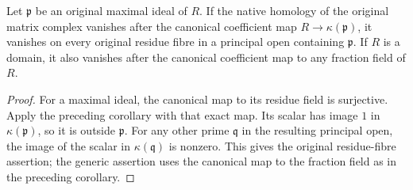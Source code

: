 \begin{corollary}
\label{cor:kn-specialization-original-closed-native-homology}
\leanok
{}
Let $\mathfrak p$ be an original maximal ideal of $R$.  If the
native homology of the original matrix complex vanishes after the
canonical coefficient map $R\to\kappa(\mathfrak p)$, it vanishes
on every original residue fibre in a principal open containing
$\mathfrak p$.  If $R$ is a domain, it also vanishes after the
canonical coefficient map to any fraction field of $R$.
\end{corollary}
\begin{proof}
For a maximal ideal, the canonical map to its residue field is
surjective.  Apply the preceding corollary with that exact map.
Its scalar has image $1$ in $\kappa(\mathfrak p)$, so it is
outside $\mathfrak p$.  For any other prime $\mathfrak q$ in
the resulting principal open, the image of the scalar in
$\kappa(\mathfrak q)$ is nonzero.  This gives the original
residue-fibre assertion; the generic assertion uses the canonical
map to the fraction field as in the preceding corollary.
\end{proof}
